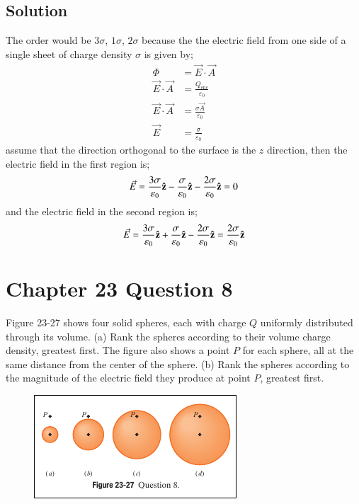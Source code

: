 \documentclass{article}
\begin{document}
\subsection*{Solution}
The order would be $3\sigma$, $1\sigma$, $2\sigma$ because the the electric field from one side of a single sheet of charge density $\sigma$ is given by;
\begin{align*}
    \Phi &= \vec{E} \cdot \vec{A} \\
	\vec{E} \cdot \vec{A} &= \frac{Q_\text{enc}}{\varepsilon_0} \\
    \vec{E} \cdot \vec{A} &= \frac{\sigma \vec{A}}{\varepsilon_0} \\
    \vec{E} &= \frac{\sigma}{\varepsilon_0}
\end{align*}
assume that the direction orthogonal to the surface is the $z$ direction, then the electric field in the first region is;
\begin{equation*}
    \vec{E} = \frac{3\sigma}{\varepsilon_0} \vu z - \frac{\sigma}{\varepsilon_0} \vu z - \frac{2\sigma}{\varepsilon_0} \vu z = 0
\end{equation*}
and the electric field in the second region is;
\begin{equation*}
    \vec{E} = \frac{3\sigma}{\varepsilon_0} \vu z + \frac{\sigma}{\varepsilon_0} \vu z - \frac{2\sigma}{\varepsilon_0} \vu z = \frac{2\sigma}{\varepsilon_0} \vu z
\end{equation*}

\section*{Chapter 23 Question 8}
Figure 23-27 shows four solid spheres, each with charge $Q$ uniformly distributed through its volume. (a) Rank the spheres according to their volume charge density, greatest first. The figure also shows a point $P$ for each sphere, all at the same distance from the center of the sphere. (b) Rank the spheres according to the magnitude of the electric field they produce at point $P$, greatest first.

\begin{figure}[ht]
    \centering
    \includegraphics[scale=0.75]{image-2.png}
\end{figure}
\end{document}
